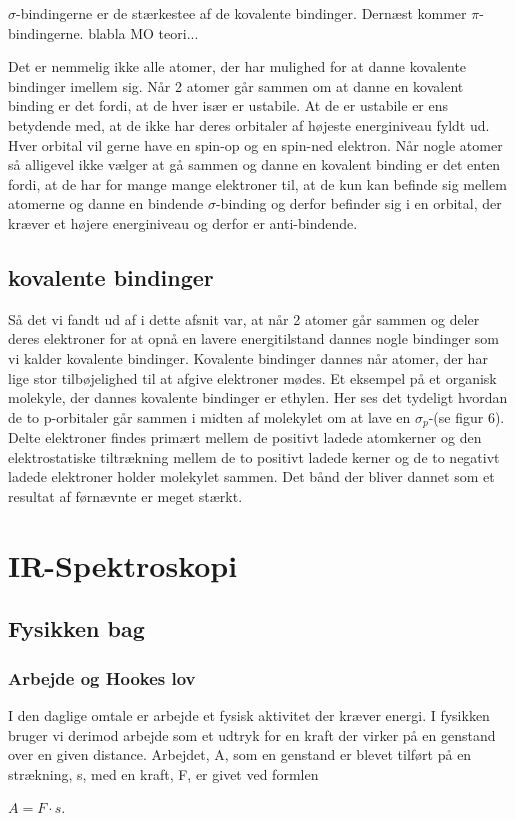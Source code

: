 \documentclass[12pt,a4paper]{article}
\theoremstyle{break}
\theoremstyle{nonumberplain}
\begin{document}
$\sigma$-bindingerne er de stærkestee af de kovalente bindinger. Dernæst kommer $\pi$-bindingerne. blabla MO teori...


Det er nemmelig ikke alle atomer, der har mulighed for at danne kovalente bindinger imellem sig. Når 2 atomer går sammen om at danne en kovalent binding er det fordi, at de hver især er ustabile. At de er ustabile er ens betydende med, at de ikke har deres orbitaler af højeste energiniveau fyldt ud. Hver orbital vil gerne have en spin-op og en spin-ned elektron. Når nogle atomer så alligevel ikke vælger at gå sammen og danne en kovalent binding er det enten fordi, at de har for mange mange elektroner til, at de kun kan befinde sig mellem atomerne og danne en bindende $\sigma$-binding og derfor befinder sig i en orbital, der kræver et højere energiniveau og derfor er anti-bindende. 

\subsection{kovalente bindinger}
Så det vi fandt ud af i dette afsnit var, at når 2 atomer går sammen og deler deres elektroner for at opnå en lavere energitilstand dannes nogle bindinger som vi kalder kovalente bindinger. Kovalente bindinger dannes når atomer, der har lige stor tilbøjelighed til at afgive elektroner mødes. Et eksempel på et organisk molekyle, der dannes kovalente bindinger er ethylen. Her ses det tydeligt hvordan de to p-orbitaler går sammen i midten af molekylet om at lave en $\sigma_p$-(se figur 6). Delte elektroner findes primært mellem de positivt ladede atomkerner og den elektrostatiske tiltrækning mellem de to positivt ladede kerner og de to negativt ladede elektroner holder molekylet sammen. Det bånd der bliver dannet som et resultat af førnævnte er meget stærkt.

\section{IR-Spektroskopi}

\subsection{Fysikken bag}

\subsubsection{Arbejde og Hookes lov}
I den daglige omtale er arbejde et fysisk aktivitet der kræver energi. I fysikken bruger vi derimod arbejde som et udtryk for en kraft der virker på en genstand over en given distance. Arbejdet, A, som en genstand er blevet tilført på en strækning, s, med en kraft, F, er givet ved formlen
\\
\begin{center}
 $A=F \cdot s$. 
\end{center}
\bigskip
\end{document}
